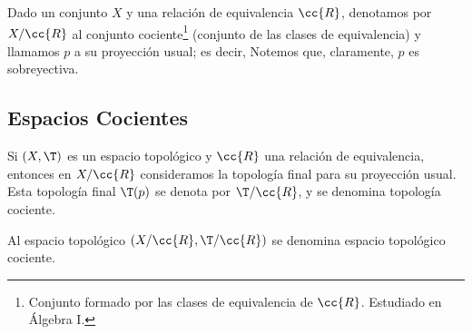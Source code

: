 \begin{notacion}
    Dado un conjunto $X$ y una relación de equivalencia $\cc{R}$, denotamos por $ X/\cc{R}$ al conjunto cociente\footnote{Conjunto formado por las clases de equivalencia de $\cc{R}$. Estudiado en Álgebra I.} (conjunto de las clases de equivalencia) y llamamos $p$ a su proyección usual; es decir,
    Notemos que, claramente, $p$ es sobreyectiva.
\end{notacion}

\subsection{Espacios Cocientes}
\begin{definicion}
    Si $(X,\T)$ es un espacio topológico y $\cc{R}$ una relación de equivalencia, entonces en $X/\cc{R}$ consideramos la topología final para su proyección usual. Esta topología final $\T(p)$ se denota por $\T/\cc{R}$, y se denomina topología cociente.

    Al espacio topológico $(X/\cc{R}, \T/\cc{R})$ se denomina espacio topológico cociente.
\end{definicion}

